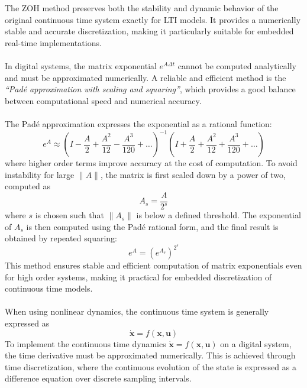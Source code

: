 The ZOH method preserves both the stability and dynamic behavior of the original continuous time system exactly for LTI models. It provides a numerically stable and accurate discretization, making it particularly suitable for embedded real-time implementations.  
\\ \\
In digital systems, the matrix exponential $e^{A\Delta t}$ cannot be computed analytically and must be approximated numerically. A reliable and efficient method is the \textit{``Padé approximation with scaling and squaring''}, which provides a good balance between computational speed and numerical accuracy.  
\\ \\
The Padé approximation expresses the exponential as a rational function:
\begin{equation}
    e^{A} \approx \left(I - \frac{A}{2} + \frac{A^2}{12} - \frac{A^3}{120} + \dots \right)^{-1}
                  \left(I + \frac{A}{2} + \frac{A^2}{12} + \frac{A^3}{120} + \dots \right)
    \label{eq:pade1}
\end{equation}
where higher order terms improve accuracy at the cost of computation. To avoid instability for large $\|A\|$, the matrix is first scaled down by a power of two, computed as
\begin{equation}
    A_s = \frac{A}{2^s}
    \label{eq:pade2}
\end{equation}
where $s$ is chosen such that $\|A_s\|$ is below a defined threshold. The exponential of $A_s$ is then computed using the Padé rational form, and the final result is obtained by repeated squaring:
\begin{equation}
    e^A = (e^{A_s})^{2^s}
    \label{eq:pade3}
\end{equation}
This method ensures stable and efficient computation of matrix exponentials even for high order systems, making it practical for embedded discretization of continuous time models.  
\\ \\
When using nonlinear dynamics, the continuous time system is generally expressed as
$$
    \dot{\mathbf{x}} = f(\mathbf{x}, \mathbf{u})
$$
To implement the continuous time dynamics $\dot{\mathbf{x}} = f(\mathbf{x}, \mathbf{u})$ on a digital system, the time derivative must be approximated numerically. This is achieved through time discretization, where the continuous evolution of the state is expressed as a difference equation over discrete sampling intervals.  
\\ \\











